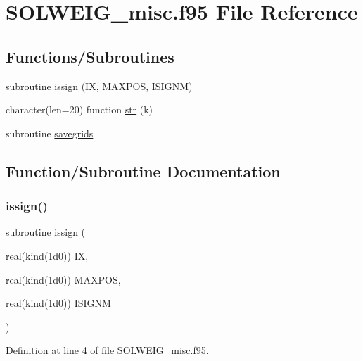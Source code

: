 \hypertarget{_s_o_l_w_e_i_g__misc_8f95}{}\section{S\+O\+L\+W\+E\+I\+G\+\_\+misc.\+f95 File Reference}
\label{_s_o_l_w_e_i_g__misc_8f95}
\subsection*{Functions/\+Subroutines}
\begin{DoxyCompactItemize}
\item 
subroutine \hyperlink{_s_o_l_w_e_i_g__misc_8f95_a4ea16a6e1a516e5c90786bcf2007885a}{issign} (IX, M\+A\+X\+P\+OS, I\+S\+I\+G\+NM)
\item 
character(len=20) function \hyperlink{_s_o_l_w_e_i_g__misc_8f95_a77a2ca74046c88062aa8333bf1eaca05}{str} (k)
\item 
subroutine \hyperlink{_s_o_l_w_e_i_g__misc_8f95_a941631427d9d11a73344f3d18d18193f}{savegrids}
\end{DoxyCompactItemize}


\subsection{Function/\+Subroutine Documentation}
\mbox{\label{_s_o_l_w_e_i_g__misc_8f95_a4ea16a6e1a516e5c90786bcf2007885a}} 
\subsubsection{\texorpdfstring{issign()}{issign()}}
{\footnotesize\ttfamily subroutine issign (\begin{DoxyParamCaption}\item[{real(kind(1d0))}]{IX,  }\item[{real(kind(1d0))}]{M\+A\+X\+P\+OS,  }\item[{real(kind(1d0))}]{I\+S\+I\+G\+NM }\end{DoxyParamCaption})}



Definition at line 4 of file S\+O\+L\+W\+E\+I\+G\+\_\+misc.\+f95.

\mbox{\label{_s_o_l_w_e_i_g__misc_8f95_a941631427d9d11a73344f3d18d18193f}} 
